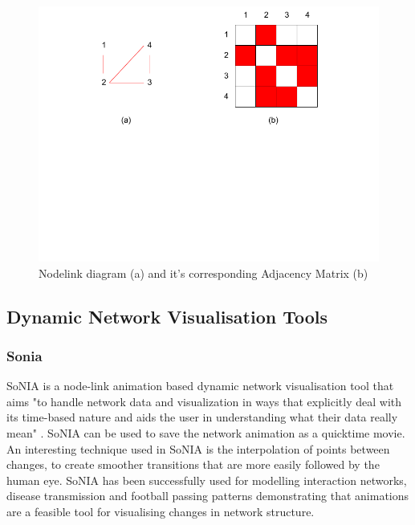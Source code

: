 \begin{figure}[H]
\begin{center}
\includegraphics[trim={0 10cm 0 0}, width=140mm]{./Figures/nlVsAdjMat.png}
\caption{Nodelink diagram (a) and it's corresponding Adjacency Matrix (b)}
\label{nlVsAdjMat}
\end{center}
\end{figure}

\subsection{Dynamic Network Visualisation Tools}
\subsubsection*{Sonia}
SoNIA \cite{sonia} is a node-link animation based dynamic network visualisation tool that aims "to handle network data and visualization in ways that explicitly deal with its time-based nature and aids the user in understanding what their data really mean" \cite{taasodnv}. SoNIA can be used to save the network animation as a quicktime movie. An interesting technique used in SoNIA is the interpolation of points between changes, to create smoother transitions that are more easily followed by the human eye. SoNIA has been successfully used for modelling interaction networks, disease transmission and football passing patterns demonstrating that animations are a feasible tool for visualising changes in network structure.

